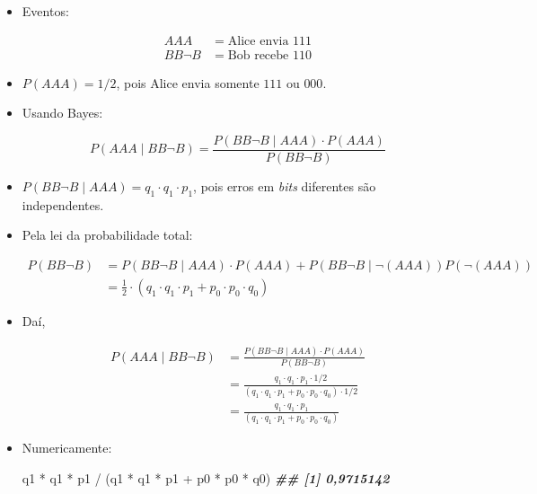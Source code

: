 \documentclass[
  11pt]{report}
\newenvironment{Shaded}{\begin{snugshade}}{\end{snugshade}}
\newcommand{\DocumentationTok}[1]{\textcolor[rgb]{0.56,0.35,0.01}{\textbf{\textit{#1}}}}
\newcommand{\NormalTok}[1]{#1}
\newcommand{\SpecialCharTok}[1]{\textcolor[rgb]{0.00,0.00,0.00}{#1}}
\renewenvironment{Shaded}{
    \begin{mdframed}[%
      roundcorner=2pt,%
      innerleftmargin=5pt,%
      innerrightmargin=5pt,%
      topline=true,%
      leftline=true,%
      rightline=true,%
      bottomline=true,%
      linewidth=0.5pt,%
      linecolor=black!20,%
      backgroundcolor=black!2,%
      skipabove=2ex,%
      skipbelow=2.5ex%
    ]%
  }
  {
    \end{mdframed}
  }
\begin{document}
\begin{itemize}
\item
  Eventos:

  \[
  \begin{aligned}
  AAA &= \text{Alice envia } 111 \\
  BB\neg B &= \text{Bob recebe } 110
  \end{aligned}
  \]
\item
  $P(AAA) = 1/2$, pois Alice envia somente $111$ ou $000$.
\item
  Usando Bayes:

  \[
  P(AAA \mid BB\neg B) = 
  \frac{P(BB\neg B \mid AAA) \cdot P(AAA)}{P(BB\neg B)}
  \]
\item
  $P(BB\neg B \mid AAA) = q_1 \cdot q_1 \cdot p_1$, pois erros em \emph{bits} diferentes são independentes.
\item
  Pela lei da probabilidade total:

  \[
  \begin{aligned}
  P(BB\neg B) 
  &= P(BB\neg B \mid AAA) \cdot P(AAA) + 
     P(BB\neg B \mid \neg(AAA))P(\neg(AAA)) \\
  &= \frac12 \cdot \left( q_1 \cdot q_1 \cdot p_1 +
     p_0 \cdot p_0 \cdot q_0 \right)
  \end{aligned}
  \]
\item
  Daí,

  \[
  \begin{aligned}
  P(AAA \mid BB\neg B) 
  &= 
  \frac{P(BB\neg B \mid AAA) \cdot P(AAA)}{P(BB\neg B)} \\
  &= 
  \frac{
    q_1 \cdot q_1 \cdot p_1 \cdot 1/2
  }{
    \left( q_1 \cdot q_1 \cdot p_1 +
     p_0 \cdot p_0 \cdot q_0 \right)\cdot 1/2
  } \\
  &= 
  \frac{
    q_1 \cdot q_1 \cdot p_1
  }{
    \left( q_1 \cdot q_1 \cdot p_1 +
     p_0 \cdot p_0 \cdot q_0 \right)
  }
  \end{aligned}
  \]
\item
  Numericamente:

\begin{Shaded}
\begin{Highlighting}[]
\NormalTok{q1 }\SpecialCharTok{*}\NormalTok{ q1 }\SpecialCharTok{*}\NormalTok{ p1 }\SpecialCharTok{/}\NormalTok{ (q1 }\SpecialCharTok{*}\NormalTok{ q1 }\SpecialCharTok{*}\NormalTok{ p1 }\SpecialCharTok{+}\NormalTok{ p0 }\SpecialCharTok{*}\NormalTok{ p0 }\SpecialCharTok{*}\NormalTok{ q0)}
\DocumentationTok{\#\# [1] 0,9715142}
\end{Highlighting}
\end{Shaded}
\end{itemize}
\end{document}
